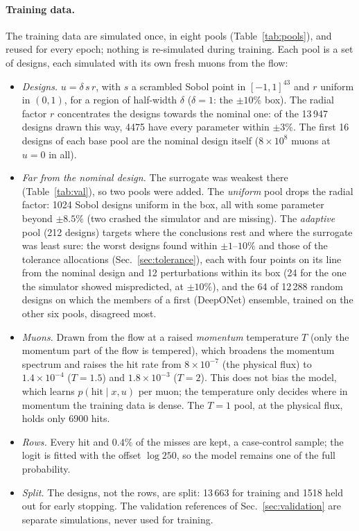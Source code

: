 \documentclass[11pt,a4paper]{article}
\begin{document}
\paragraph{Training data.}
The training data are simulated once, in eight pools (Table~\ref{tab:pools}), and reused for every
epoch; nothing is re-simulated during training. Each pool is a set of designs, each simulated
with its own fresh muons from the flow:
\begin{itemize}
  \item \emph{Designs.} $u=\delta\,s\,r$, with $s$ a scrambled Sobol point in $[-1,1]^{43}$ and
        $r$ uniform in $(0,1)$, for a region of half-width $\delta$ ($\delta=1$: the $\pm10\%$
        box). The radial factor $r$ concentrates the designs towards the nominal one: of the
        13\,947 designs drawn this way, 4475 have every parameter within $\pm3\%$. The
        first 16 designs of each base pool are the nominal design itself ($8\times10^8$ muons
        at $u=0$ in all).
  \item \emph{Far from the nominal design.} The surrogate was weakest there (Table~\ref{tab:val}),
        so two pools were added. The \emph{uniform} pool drops the radial factor: 1024 Sobol
        designs uniform in the box, all with some parameter beyond $\pm8.5\%$ (two crashed the
        simulator and are missing). The \emph{adaptive} pool (212 designs) targets where the
        conclusions rest and where the surrogate was least sure: the worst designs found within
        $\pm1$--$10\%$ and those of the tolerance allocations (Sec.~\ref{sec:tolerance}), each with
        four points on its line from the nominal design and 12 perturbations within its box (24
        for the one the simulator showed mispredicted, at $\pm10\%$), and the 64 of 12\,288 random
        designs on which the members of a first (DeepONet) ensemble, trained on the other six
        pools, disagreed
        most.
  \item \emph{Muons.} Drawn from the flow at a raised \emph{momentum} temperature $T$ (only the
        momentum part of the flow is tempered), which broadens the momentum spectrum and raises
        the hit rate from $8\times10^{-7}$ (the physical flux) to $1.4\times10^{-4}$ ($T=1.5$)
        and $1.8\times10^{-3}$ ($T=2$). This does not bias the model, which learns
        $p(\text{hit}\mid x,u)$ per muon; the temperature only decides where in momentum the
        training data is dense. The $T=1$ pool, at the physical flux, holds only 6900 hits.
  \item \emph{Rows.} Every hit and $0.4\%$ of the misses are kept, a case-control sample; the
        logit is fitted with the offset $\log 250$, so the model remains one of the full
        probability.
  \item \emph{Split.} The designs, not the rows, are split: 13\,663 for training and 1518
        held out for early stopping. The validation references of Sec.~\ref{sec:validation} are
        separate simulations, never used for training.
\end{itemize}
\end{document}
